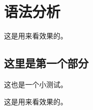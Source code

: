 \chapter{语法分析}

\begin{center}
这是用来看效果的。
\end{center}

\section{这里是第一个部分}
这也是一个小测试。

\newpage

\begin{center}
这是用来看效果的。
\end{center}
